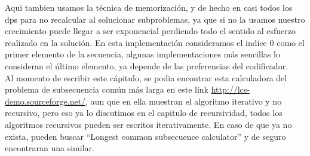 Aqui tambien usamos la técnica de memorización, y de hecho en casi todos los dps para no recalcular al solucionar subproblemas, ya que si no la usamos nuestro crecimiento puede llegar a ser exponencial perdiendo todo el sentido al esfuerzo realizado en la solución. En esta implementación consideramos el indice $0$ como el primer elemento de la secuencia, algunas implementaciones más sencillas lo consideran el último elemento, ya depende de las preferencias del codificador.
\\Al momento de escribir este cápitulo, se podia encontrar esta calculadora del problema de subsecuencia común más larga en este link \url{http://lcs-demo.sourceforge.net/}, aun que en ella muestran el algoritmo iterativo y no recursivo, pero eso ya lo discutimos en el capitulo de recursividad, todos los algoritmos recursivos pueden ser escritos iterativamente. En caso de que ya no exista, pueden buscar ``Longest common subsecuence calculator'' y de seguro encontraran una similar.